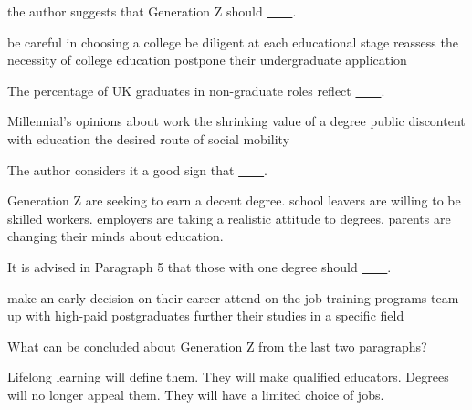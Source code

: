 \item the author suggests that Generation Z should \uline{~~~~}.
\begin{tasks}
	\task be careful in choosing a college
	\task be diligent at each educational stage
	\task reassess the necessity of college education
	\task postpone their undergraduate application
\end{tasks}
\item The percentage of UK graduates in non-graduate roles reflect \uline{~~~~}.
\begin{tasks}
	\task Millennial's opinions about work
	\task the shrinking value of a degree
	\task public discontent with education
	\task the desired route of social mobility
\end{tasks}
\item The author considers it a good sign that \uline{~~~~}.
\begin{tasks}
	\task Generation Z are seeking to earn a decent degree.
	\task school leavers are willing to be skilled workers.
	\task employers are taking a realistic attitude to degrees.
	\task parents are changing their minds about education.
\end{tasks}
\item It is advised in Paragraph 5 that those with one degree should \uline{~~~~}.
\begin{tasks}
	\task make an early decision on their career
	\task attend on the job training programs
	\task team up with high-paid postgraduates
	\task further their studies in a specific field
\end{tasks}
\item What can be concluded about Generation Z from the last two paragraphs?
\begin{tasks}
	\task Lifelong learning will define them.
	\task They will make qualified educators.
	\task Degrees will no longer appeal them.
	\task They will have a limited choice of jobs.
\end{tasks}
